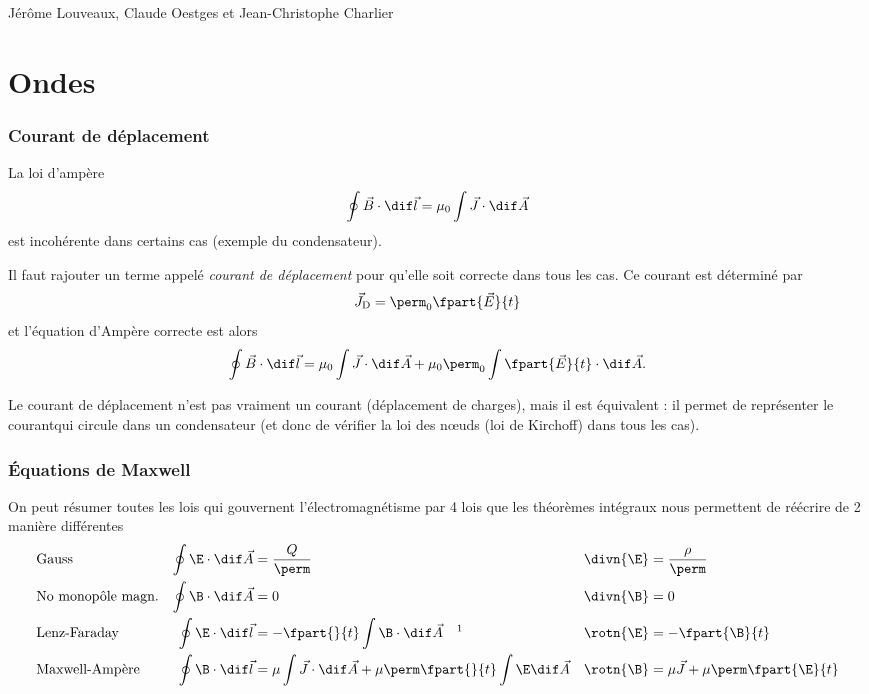 

\usepackage{pgfplots}
\usepackage{caption}
\usepackage{subcaption}
\usepackage{xspace}

{Jérôme Louveaux, Claude Oestges et Jean-Christophe Charlier}

\part{Ondes}
\section{Courant de déplacement}
La loi d'ampère
\[ \oint \vec{B} \cdot \dif \vec{l} = \mu_0 \int \vec{J} \cdot \dif \vec{A} \]
est incohérente dans certains cas (exemple du condensateur).

Il faut rajouter un terme appelé \emph{courant de déplacement}
pour qu'elle soit correcte dans tous les cas.
Ce courant est déterminé par
\[ \vec{J}_\mathrm{D} = \perm_0\fpart{\vec{E}}{t} \]
et l'équation d'Ampère correcte est alors
\[ \oint \vec{B} \cdot \dif \vec{l} =
\mu_0 \int \vec{J} \cdot \dif \vec{A} +
\mu_0\perm_0 \int\fpart{\vec{E}}{t} \cdot \dif \vec{A}. \]

Le courant de déplacement n'est pas vraiment un courant (déplacement de charges),
mais il est équivalent : il permet de représenter le \og courant\fg qui
circule dans un condensateur (et donc de vérifier la loi des n\oe{}uds
(loi de Kirchoff) dans tous les cas).

\section{Équations de Maxwell}
On peut résumer toutes les lois qui gouvernent l'électromagnétisme
par 4 lois que les théorèmes intégraux nous permettent de réécrire
de 2 manière différentes
\begin{align*}
  &\text{Gauss} & \oint \E \cdot \dif \vec{A} & = \frac{Q}{\perm}
  & \divn{\E} & = \frac{\rho}{\perm}\\
  &\text{No monopôle magn.} & \oint \B \cdot \dif \vec{A} & = 0
  & \divn{\B} & = 0\\
  &\text{Lenz-Faraday} & \oint \E \cdot \dif \vec{l} & = -\fpart{}{t} \int \B \cdot \dif \vec{A}~~~\text{\footnotemark}
  & \rotn{\E} & = -\fpart{\B}{t}\\
  &\text{Maxwell-Ampère} & \oint \B \cdot \dif \vec{l} & = \mu \int \vec{J} \cdot \dif \vec{A}
  + \mu\perm\fpart{}{t} \int \E \dif \vec{A}
  & \rotn{\B} & = \mu\vec{J} + \mu\perm\fpart{\E}{t}
\end{align*}

